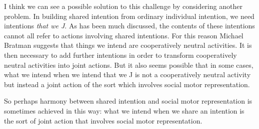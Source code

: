 \documentclass[12pt,\papersize]{extarticle}
\begin{document}
I think we can see a possible solution to this challenge by considering another problem.
In building shared intention from ordinary individual intention, we need intentions \emph{that we J}.
As has been much discussed, the contents of these intentions cannot all refer to actions involving shared intentions.
For this reason Michael Bratman suggests that things we intend are  cooperatively neutral activities.
It is then necessary to add further intentions in order to transform cooperatively neutral activities into joint actions.
But it also seems possible that in some cases, what we intend when we intend that we J is not a cooperatively neutral activity but instead a joint action of the sort which involves social motor representation.

So perhaps harmony between shared intention and social motor representation is sometimes achieved in this way: what we intend when we share an intention is the sort of joint action that involves social motor representation.




\end{document}
